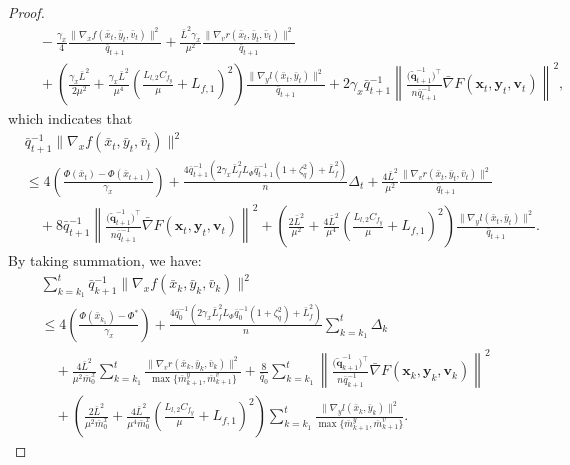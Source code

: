 \documentclass{article}
\theoremstyle{plain}
\theoremstyle{definition}
\theoremstyle{remark}
\begin{document}
\begin{proof}
\begin{align}
&\quad -\frac{\gamma_x }{4}\frac{\|\nabla_x f(\bar{x}_t, \bar{y}_t, \bar{v}_t)\|^2}{\bar{q}_{t+1}}
+ \frac{\bar{L}^2\gamma_x }{\mu^2} \frac{\|\nabla_v r(\bar{x}_t, \bar{y}_t, \bar{v}_t)\|^2}{\bar{q}_{t+1}} \nonumber\\
&\quad+\!\left(\! \frac{\gamma_x\bar{L}^2}{2\mu^2} \!+\! \frac{\gamma_x\bar{L}^2}{\mu^4} \!\!\left(\! \frac{L_{l,2} C_{f_y}}{\mu} + L_{f,1} \!\right)^2 \right)\!\! \frac{\|\nabla_y l(\bar{x}_t, \bar{y}_t)\|^2}{\bar{q}_{t+1}}\!+\! 2\gamma_x \bar{q}_{t+1}^{-1}  \left\| \frac{\big(\tilde{\mathbf{q}}_{t+1}^{-1}\big)^\top}{n\bar{q}_{t+1}^{-1}} \bar{\nabla}F(\mathbf{x}_t, \mathbf{y}_t, \mathbf{v}_t) \right\|^2\!\!,\label{eq131}
\end{align}
which indicates that
\begin{align}
&\bar{q}_{t+1}^{-1}\|\nabla_x f(\bar{x}_t, \bar{y}_t, \bar{v}_t)\|^2\nonumber\\
&\leq4\left(\frac{\Phi(\bar{x}_t)-\Phi(\bar{x}_{t+1})}{\gamma_x }\right)+\frac{4\bar{q}_{t+1}^{-1}(2\gamma_x \bar{L}_{f}^2L_\Phi \bar{q}_{t+1}^{-1} \left(1 +\zeta_q^2\right)+\bar{L}_f^2)}{n} \Delta_t+ \frac{4\bar{L}^2 }{\mu^2} \frac{\|\nabla_v r(\bar{x}_t, \bar{y}_t, \bar{v}_t)\|^2}{\bar{q}_{t+1}}\nonumber\\
&\quad + 8 \bar{q}_{t+1}^{-1}  \left\| \frac{\big(\tilde{\mathbf{q}}_{t+1}^{-1}\big)^\top}{n\bar{q}_{t+1}^{-1}} \bar{\nabla} F(\mathbf{x}_t, \mathbf{y}_t, \mathbf{v}_t) \right\|^2 +\left(\! \frac{2\bar{L}^2}{\mu^2} + \frac{4\bar{L}^2}{\mu^4} \!\!\left(\! \frac{L_{l,2} C_{f_y}}{\mu} + L_{f,1} \!\right)^2 \right)\!\! \frac{\|\nabla_y l(\bar{x}_t, \bar{y}_t)\|^2}{\bar{q}_{t+1}}.\label{eq132}
\end{align}
By taking summation, we have:
\begin{align}
&\sum_{k=k_1}^t  \bar{q}_{k+1}^{-1}\|\nabla_x f(\bar{x}_k, \bar{y}_k, \bar{v}_k)\|^2\nonumber\\
&\leq4\left(\frac{\Phi(\bar{x}_{k_1})-\Phi^*}{\gamma_x}\right)+\frac{4\bar{q}_{0}^{-1}(2\gamma_x \bar{L}_{f}^2L_\Phi \bar{q}_0^{-1} \left(1 +\zeta_q^2\right)+\bar{L}_f^2)}{n}\sum_{k=k_1}^t \Delta_k\nonumber\\
&\quad + \frac{4\bar{L}^2 }{\mu^2\bar{m}^x_{0}}\sum_{k=k_1}^t \frac{\|\nabla_v r(\bar{x}_k, \bar{y}_k, \bar{v}_k)\|^2}{\max\{\bar{m}^y_{k+1},\bar{m}^v_{k+1}\}}+ \frac{8}{\bar{q}_{0}}\sum_{k=k_1}^t \left\| \frac{\big(\tilde{\mathbf{q}}_{k+1}^{-1}\big)^\top}{n\bar{q}_{k+1}^{-1}} \bar{\nabla} F(\mathbf{x}_k, \mathbf{y}_k, \mathbf{v}_k) \right\|^2 \nonumber\\
&\quad+ \left( \frac{2\bar{L}^2}{\mu^2\bar{m}^x_{0}} + \frac{4\bar{L}^2}{\mu^4\bar{m}^x_{0}} \left( \frac{L_{l,2} C_{f_y}}{\mu} + L_{f,1} \right)^2 \right)\sum_{k=k_1}^t \frac{\|\nabla_y l(\bar{x}_k, \bar{y}_k)\|^2}{\max\{\bar{m}^y_{k+1},\bar{m}^v_{k+1}\}}.\label{eq133}

\end{align}
\end{proof}
\end{document}
